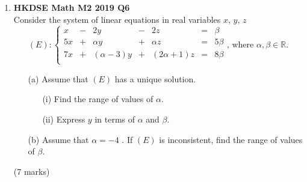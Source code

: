 \documentclass{report}
\begin{document}
\begin{enumerate}
	\item \textbf{HKDSE Math M2 2019 Q6}\\
	Consider the system of linear equations in real variables $x$, $y$, $z$
	$$(E):\left\{\begin{matrix}
		 x&  -&2y&  -&2z& = &\beta  \\
		5x&  +&\alpha y&  +&\alpha z& = & 5\beta \\
	7x&  +&(\alpha - 3)y&  +&(2\alpha+1)z& = & 8\beta \\
		\end{matrix}\right.\text{, where }\alpha, \beta \in \mathbb{R}.$$
	\begin{enumerate}
		\item [(a)]Assume that $(E)$ has a unique solution.
		\begin{enumerate}
			\item [(i)]Find the range of values of $\alpha$. 
			\item [(ii)]Express $y$ in terms of $\alpha$ and $\beta$. 
		\end{enumerate}
		\item [(b)]Assume that $\alpha = -4$ . If  $(E)$ is inconsistent, find the range of values of $\beta$.
	\end{enumerate}
	(7 marks)


\end{enumerate}
\end{document}
